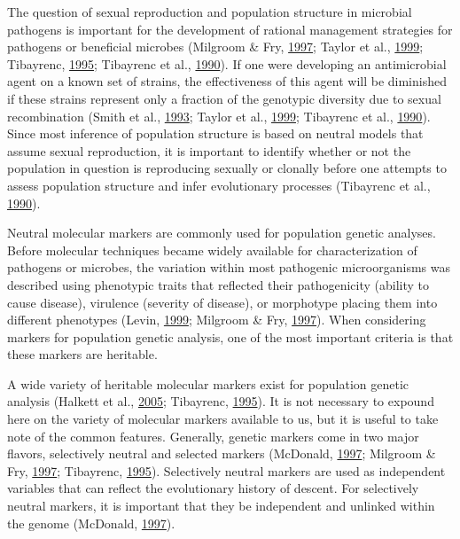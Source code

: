 \documentclass[double,11pt]{beavtex}
\begin{document}
  The question of sexual reproduction and population structure in
  microbial pathogens is important for the development of rational
  management strategies for pathogens or beneficial microbes (Milgroom \&
  Fry, \protect\hyperlink{ref-milgroom1997contributions}{1997}; Taylor et
  al., \protect\hyperlink{ref-taylor1999evolutionary}{1999}; Tibayrenc,
  \protect\hyperlink{ref-tibayrenc1995population}{1995}; Tibayrenc et al.,
  \protect\hyperlink{ref-tibayrenc1990clonal}{1990}). If one were
  developing an antimicrobial agent on a known set of strains, the
  effectiveness of this agent will be diminished if these strains
  represent only a fraction of the genotypic diversity due to sexual
  recombination (Smith et al., \protect\hyperlink{ref-smith1993how}{1993};
  Taylor et al., \protect\hyperlink{ref-taylor1999evolutionary}{1999};
  Tibayrenc et al., \protect\hyperlink{ref-tibayrenc1990clonal}{1990}).
  Since most inference of population structure is based on neutral models
  that assume sexual reproduction, it is important to identify whether or
  not the population in question is reproducing sexually or clonally
  before one attempts to assess population structure and infer
  evolutionary processes (Tibayrenc et al.,
  \protect\hyperlink{ref-tibayrenc1990clonal}{1990}).
  
  Neutral molecular markers are commonly used for population genetic
  analyses. Before molecular techniques became widely available for
  characterization of pathogens or microbes, the variation within most
  pathogenic microorganisms was described using phenotypic traits that
  reflected their pathogenicity (ability to cause disease), virulence
  (severity of disease), or morphotype placing them into different
  phenotypes (Levin, \protect\hyperlink{ref-levin1999population}{1999};
  Milgroom \& Fry,
  \protect\hyperlink{ref-milgroom1997contributions}{1997}). When
  considering markers for population genetic analysis, one of the most
  important criteria is that these markers are heritable.
  
  A wide variety of heritable molecular markers exist for population
  genetic analysis (Halkett et al.,
  \protect\hyperlink{ref-halkett2005tackling}{2005}; Tibayrenc,
  \protect\hyperlink{ref-tibayrenc1995population}{1995}). It is not
  necessary to expound here on the variety of molecular markers available
  to us, but it is useful to take note of the common features. Generally,
  genetic markers come in two major flavors, selectively neutral and
  selected markers (McDonald,
  \protect\hyperlink{ref-mcdonald1997population}{1997}; Milgroom \& Fry,
  \protect\hyperlink{ref-milgroom1997contributions}{1997}; Tibayrenc,
  \protect\hyperlink{ref-tibayrenc1995population}{1995}). Selectively
  neutral markers are used as independent variables that can reflect the
  evolutionary history of descent. For selectively neutral markers, it is
  important that they be independent and unlinked within the genome
  (McDonald, \protect\hyperlink{ref-mcdonald1997population}{1997}).
  
\end{document}
